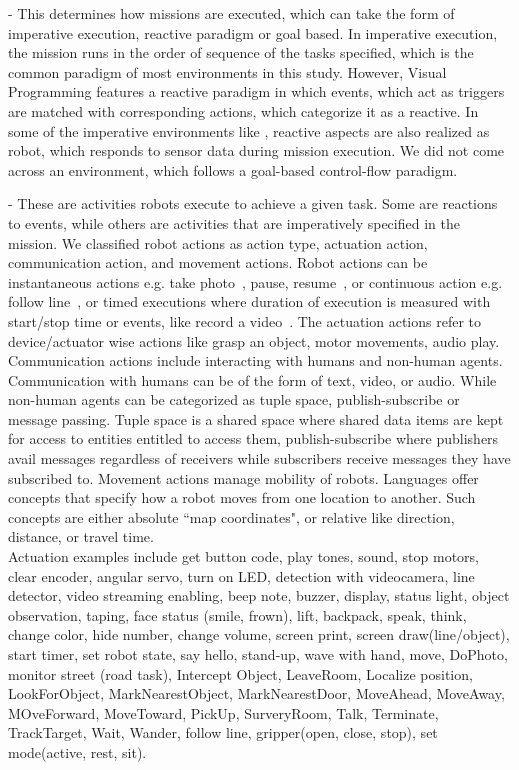  - This determines how missions are executed, which can take the form of imperative execution, reactive paradigm or goal based. In imperative execution, the mission runs in the order of sequence of the tasks specified, which is the common paradigm of most environments in this study. However, \aseba Visual Programming features a reactive paradigm in which events, which act as triggers are matched with corresponding actions, which categorize it as a reactive. In some of the imperative environments like \picaxe, reactive aspects are also realized as robot, which responds to sensor data during mission execution. We did not come across an environment, which follows a goal-based control-flow paradigm.

 
 - These are activities robots execute to achieve a given task. Some are reactions to events, while others are activities that are imperatively specified in the mission. We classified robot actions as action type, actuation action, communication action, and movement actions. Robot actions  can be instantaneous actions e.g. take photo~\cite{FLYAQ}, pause, resume~\cite{PICAXE}, or continuous action e.g. follow line~\cite{LEGO,Sphero}, or timed executions where duration of execution is measured with start/stop time or events, like record a video~\cite{FLYAQ}. The actuation actions refer to device/actuator wise actions like grasp an object, motor movements, audio play. Communication actions include interacting with humans and non-human agents.  Communication with humans can be of the form of text, video, or audio. While non-human agents can  be categorized as tuple space, publish-subscribe or message passing. Tuple space is a shared space where shared data items are kept for access to entities entitled to access them, publish-subscribe where publishers avail messages regardless of receivers while subscribers receive messages they have subscribed to.
Movement actions manage mobility of robots. Languages offer concepts that specify how a robot moves from one location to another. Such  concepts are either absolute ``map coordinates", or relative like direction, distance, or travel time.\\

Actuation examples include get button code, play tones, sound, stop motors, clear encoder, angular servo, turn on LED, detection with videocamera, line detector, video streaming enabling, beep note, buzzer, display, status light, object observation, taping, face status (smile, frown), lift, backpack, speak, think, change color, hide number, change volume, screen print, screen draw(line/object), start timer, set robot state, say hello, stand-up, wave with hand, move, DoPhoto, monitor street (road task), Intercept Object, LeaveRoom, Localize position, LookForObject, MarkNearestObject, MarkNearestDoor, MoveAhead, MoveAway, MOveForward, MoveToward, PickUp, SurveryRoom, Talk, Terminate, TrackTarget, Wait, Wander, follow line, gripper(open, close, stop), set mode(active, rest, sit). \\ 
 
